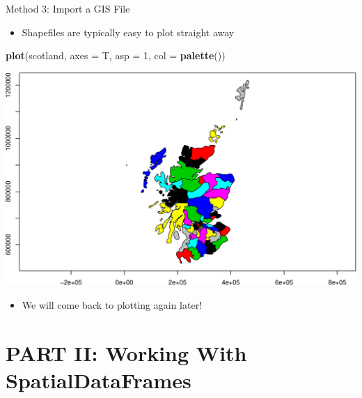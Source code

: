 \documentclass[10pt,ignorenonframetext,]{beamer}
\newenvironment{Shaded}{\begin{snugshade}}{\end{snugshade}}
\newcommand{\KeywordTok}[1]{\textcolor[rgb]{0.13,0.29,0.53}{\textbf{{#1}}}}
\newcommand{\DataTypeTok}[1]{\textcolor[rgb]{0.13,0.29,0.53}{{#1}}}
\newcommand{\DecValTok}[1]{\textcolor[rgb]{0.00,0.00,0.81}{{#1}}}
\newcommand{\NormalTok}[1]{{#1}}
\providecommand{\tightlist}{%
  \setlength{\itemsep}{0pt}\setlength{\parskip}{0pt}}
\begin{document}
\begin{frame}[fragile]{Method 3: Import a GIS File}

\begin{itemize}
\tightlist
\item
  Shapefiles are typically easy to plot straight away
\end{itemize}

\begin{Shaded}
\begin{Highlighting}[]
\KeywordTok{plot}\NormalTok{(scotland, }\DataTypeTok{axes =} \NormalTok{T, }\DataTypeTok{asp =} \DecValTok{1}\NormalTok{, }\DataTypeTok{col =} \KeywordTok{palette}\NormalTok{())}
\end{Highlighting}
\end{Shaded}

\begin{center}\includegraphics[width=0.8\linewidth]{SpatialDataLecture_files/figure-beamer/plot_scotland-1} \end{center}

\begin{itemize}
\tightlist
\item
  We will come back to plotting again later!
\end{itemize}

\end{frame}

\section{PART II: Working With
SpatialDataFrames}\label{part-ii-working-with-spatialdataframes}
\end{document}
